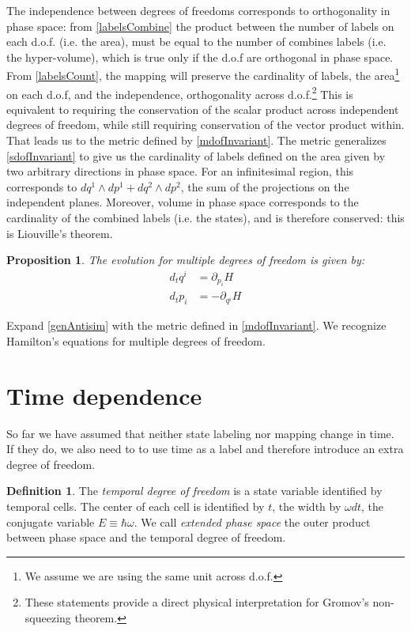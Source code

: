 \documentclass[aps,pra,10pt,twocolumn,floatfix,nofootinbib]{revtex4-1}
\newtheorem{prop}[thm]{Proposition}
\theoremstyle{definition}
\newtheorem{defn}[thm]{Definition}
\begin{document}
The independence between degrees of freedoms corresponds to orthogonality in phase space: from \ref{labelsCombine} the product between the number of labels on each d.o.f. (i.e. the area), must be equal to the number of combines labels (i.e. the hyper-volume), which is true only if the d.o.f are orthogonal in phase space. From \ref{labelsCount}, the mapping will preserve the cardinality of labels, the area\footnote{We assume we are using the same unit across d.o.f.} on each d.o.f, and the independence, orthogonality across d.o.f.\footnote{These statements provide a direct physical interpretation for Gromov's non-squeezing theorem\cite{Gromov,deGosson,Stewart}.} This is equivalent to requiring the conservation of the scalar product across independent degrees of freedom, while still requiring conservation of the vector product within. That leads us to the metric defined by \ref{mdofInvariant}.
The metric generalizes \ref{sdofInvariant} to give us the cardinality of labels defined on the area given by two arbitrary directions in phase space. For an infinitesimal region, this corresponds to $dq^1 \wedge dp^1 + dq^2 \wedge dp^2$, the sum of the projections on the independent planes. Moreover, volume in phase space corresponds to the cardinality of the combined labels (i.e. the states), and is therefore conserved: this is Liouville's theorem.

\begin{prop}\label{mdofHam}
The evolution for multiple degrees of freedom is given by:
\begin{align*}
d_{t}q^i &= \partial_{p_i} H \\
d_{t}p_i &= - \partial_{q^i} H
\end{align*}
\end{prop}

Expand \ref{genAntisim} with the metric defined in \ref{mdofInvariant}. We recognize Hamilton's equations for multiple degrees of freedom\cite{classical_dynamics}.

\section{Time dependence}

So far we have assumed that neither state labeling nor mapping change in time. If they do, we also need to to use time as a label and therefore introduce an extra degree of freedom.

\begin{defn}\label{tdof}
The \emph{temporal degree of freedom} is a state variable identified by temporal cells. The center of each cell is identified by $t$, the width by $\omega dt$, the conjugate variable $E\equiv\hbar\omega$. We call \emph{extended phase space} the outer product between phase space and the temporal degree of freedom.
\end{defn}
\end{document}
